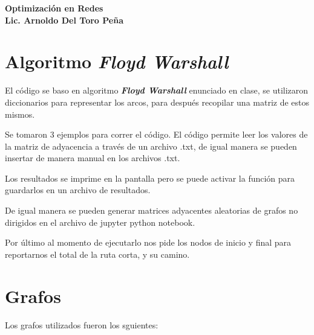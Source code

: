 \documentclass{report}
\newcommand{\war}{ \textit{{\bfseries{Floyd Warshall}}} }
\begin{document}
\begin{center}
  {  \bfseries \LARGE Optimización en Redes} \\
{ \bfseries \Large Lic. Arnoldo Del Toro Peña }
\end{center}
\section*{Algoritmo \war} 

El código se baso en algoritmo \war enunciado en clase, se utilizaron diccionarios para representar los arcos, para después recopilar una matriz de estos mismos.

Se tomaron 3 ejemplos para correr el código. El código permite leer los valores de la matriz de adyacencia a través de un archivo .txt, de igual manera se pueden insertar de manera manual en los archivos .txt.

Los resultados se imprime en la pantalla pero se puede activar la función para guardarlos en un archivo de resultados.

De igual manera se pueden generar matrices adyacentes aleatorias de grafos no dirigidos en el archivo de jupyter python notebook.

Por último al momento de ejecutarlo nos pide los nodos de inicio y final para reportarnos el total de la ruta corta, y su camino.

\section*{Grafos}

Los grafos utilizados fueron los sguientes:
\end{document}
